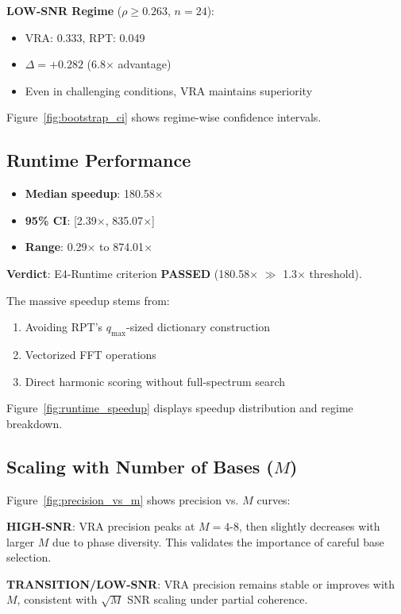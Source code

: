 \documentclass[conference]{IEEEtran}
\begin{document}
\textbf{LOW-SNR Regime} ($\rho \geq 0.263$, $n=24$):
\begin{itemize}
    \item VRA: 0.333, RPT: 0.049
    \item $\Delta = +0.282$ (6.8$\times$ advantage)
    \item Even in challenging conditions, VRA maintains superiority
\end{itemize}

Figure~\ref{fig:bootstrap_ci} shows regime-wise confidence intervals.

\subsection{Runtime Performance}

\begin{itemize}
    \item \textbf{Median speedup}: 180.58$\times$
    \item \textbf{95\% CI}: [2.39$\times$, 835.07$\times$]
    \item \textbf{Range}: 0.29$\times$ to 874.01$\times$
\end{itemize}

\textbf{Verdict}: E4-Runtime criterion \textbf{PASSED} (180.58$\times$ $\gg$ 1.3$\times$ threshold).

The massive speedup stems from:
\begin{enumerate}
    \item Avoiding RPT's $q_{\max}$-sized dictionary construction
    \item Vectorized FFT operations
    \item Direct harmonic scoring without full-spectrum search
\end{enumerate}

Figure~\ref{fig:runtime_speedup} displays speedup distribution and regime breakdown.

\subsection{Scaling with Number of Bases ($M$)}

Figure~\ref{fig:precision_vs_m} shows precision vs. $M$ curves:

\textbf{HIGH-SNR}: VRA precision peaks at $M=4$-$8$, then slightly decreases with larger $M$ due to phase diversity. This validates the importance of careful base selection.

\textbf{TRANSITION/LOW-SNR}: VRA precision remains stable or improves with $M$, consistent with $\sqrt{M}$ SNR scaling under partial coherence.
\end{document}
